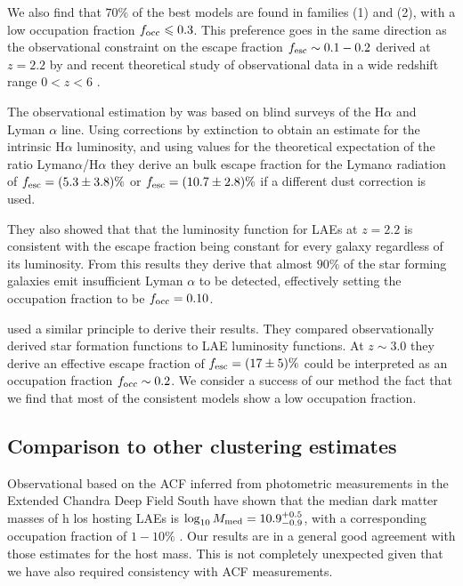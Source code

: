 \documentclass[usenatbib]{mn2e}
\newcommand{\Msun}{{\ifmmode{{\rm {M_{\odot}}}}\else{${\rm{M_{\odot}}}$}\fi}}
\begin{document}
We also find that $70\%$ of the best models are found in families (1)
and (2), with a low occupation fraction $f_{\rm occ}\leq 0.3$. This
preference goes in the same direction as the observational constraint
on the escape fraction $f_{\rm esc}\sim 0.1-0.2$ derived at $z=2.2$ by \cite{Hayes2010}
and recent theoretical study of observational data in a wide redshift
range $0<z<6$  \citep{Dijkstra2013}.  

The observational estimation by \cite{Hayes2010} was based on blind
surveys of the H$\alpha$ and Lyman $\alpha$ line. Using corrections by
extinction to obtain an estimate for the intrinsic H$\alpha$
luminosity, and using values for the theoretical expectation of the
ratio Lyman$\alpha$/H$\alpha$ they derive an bulk escape fraction for
the Lyman$\alpha$ radiation of $f_{\rm esc}=(5.3\pm 3.8)\%$ or $f_{\rm
  esc}=(10.7\pm 2.8)\%$ if a different dust correction is used. 

They also showed that that the luminosity function for LAEs at $z=2.2$ is
consistent with the escape fraction being constant for every galaxy
regardless of its luminosity. From this results they derive that
almost $90\%$ of the star forming galaxies emit insufficient
Lyman $\alpha$ to be detected, effectively setting the occupation
fraction to be $f_{\rm occ}=0.10$.  

\cite{Dijkstra2013} used a similar principle to derive their results. They
compared observationally derived star formation functions to LAE
luminosity functions. At $z\sim 3.0$ they derive an effective escape
fraction of $f_{\rm esc}=(17\pm 5)\%$ could be interpreted as an
occupation fraction $f_{\rm occ}\sim 0.2$.  We consider a success of
our method the fact that we find that most of the consistent models
show a low occupation fraction.    



\subsection{Comparison to other clustering estimates}

Observational based on the ACF inferred from photometric measurements
in the Extended Chandra Deep Field South have shown that the median
dark matter masses of h los hosting LAEs is $\log_{10}M_{\rm
  med}=10.9^{+0.5}_{-0.9}$\Msun, with a corresponding occupation
fraction of $1-10\%$  \citep{Gawiser07}.  Our results are in a general
good agreement with those estimates for the host mass. This is not
completely unexpected given that we have also required consistency
with ACF measurements.   
\end{document}

